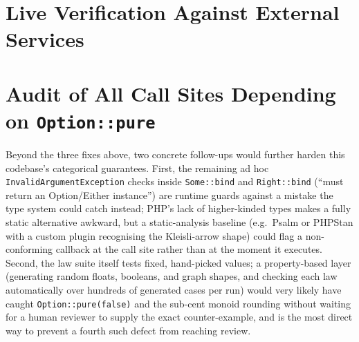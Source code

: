 \documentclass[a4paper,12pt,fleqn]{article}
\begin{document}
\newpage
\section{Live Verification Against External Services}\label{sec:verification}


\newpage
\section{Audit of All Call Sites Depending on \texttt{Option::pure}}\label{sec:audit}




Beyond the three fixes above, two concrete follow-ups would further harden this codebase's categorical guarantees. First, the remaining ad hoc \texttt{InvalidArgumentException} checks inside \texttt{Some::bind} and \texttt{Right::bind} (``must return an Option/Either instance'') are runtime guards against a mistake the type system could catch instead; PHP's lack of higher-kinded types makes a fully static alternative awkward, but a static-analysis baseline (e.g.\ Psalm or PHPStan with a custom plugin recognising the Kleisli-arrow shape) could flag a non-conforming callback at the call site rather than at the moment it executes. Second, the law suite itself tests fixed, hand-picked values; a property-based layer (generating random floats, booleans, and graph shapes, and checking each law automatically over hundreds of generated cases per run) would very likely have caught \texttt{Option::pure(false)} and the sub-cent monoid rounding without waiting for a human reviewer to supply the exact counter-example, and is the most direct way to prevent a fourth such defect from reaching review.




\newpage
\begin{appendices}

\end{appendices}
\end{document}
